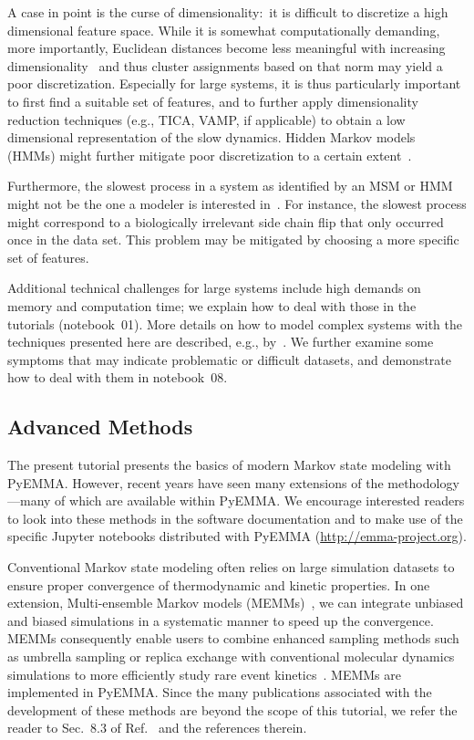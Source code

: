 \documentclass[9pt,tutorial]{livecoms}
\begin{document}
A case in point is the curse of dimensionality:~it is difficult to discretize a high dimensional feature space.
While it is somewhat computationally demanding, more importantly,
Euclidean distances become less meaningful with increasing dimensionality~\cite{aggarwal_surprising_2001}
and thus cluster assignments based on that norm may yield a poor discretization.
Especially for large systems, it is thus particularly important to first find a suitable set of features,
and to further apply dimensionality reduction techniques (e.g., TICA, VAMP, if applicable)
to obtain a low dimensional representation of the slow dynamics.
Hidden Markov models (HMMs) might further mitigate poor discretization to a certain extent~\cite{noe-proj-hid-msm}.

Furthermore, the slowest process in a system as identified by an MSM or HMM might not be the one a modeler is interested in~\cite{banushkina_nonparametric_2015}.
For instance, the slowest process might correspond to a biologically irrelevant side chain flip that only occurred once in the data set.
This problem may be mitigated by choosing a more specific set of features.

Additional technical challenges for large systems include high demands on memory and computation time;
we explain how to deal with those in the tutorials (notebook~01).
More details on how to model complex systems with the techniques presented here are described, e.g., by~\cite{plattner_protein_2015,plattner_complete_2017}.
We further examine some symptoms that may indicate problematic or difficult datasets, and demonstrate how to deal with them in notebook~08.

\subsection{Advanced Methods}

The present tutorial presents the basics of modern Markov state modeling with PyEMMA. 
However, recent years have seen many extensions of the methodology---many of which are available within PyEMMA. 
We encourage interested readers to look into these methods in the software documentation
and to make use of the specific Jupyter notebooks distributed with PyEMMA (\url{http://emma-project.org}).

Conventional Markov state modeling often relies on large simulation datasets to ensure proper convergence of thermodynamic and kinetic properties. 
In one extension, Multi-ensemble Markov models (MEMMs)~\cite{dtram,tram},
we can integrate unbiased and biased simulations in a systematic manner to speed up the convergence. 
MEMMs consequently enable users to combine enhanced sampling methods such as umbrella sampling or replica exchange
with conventional molecular dynamics simulations to more efficiently study rare event kinetics~\cite{trammbar}. 
MEMMs are implemented in PyEMMA.
Since the many publications associated with the development of these methods are beyond the scope of this tutorial, we refer the reader to Sec.~8.3 of Ref.~\cite{msm-brooke} and the references therein.
\end{document}

